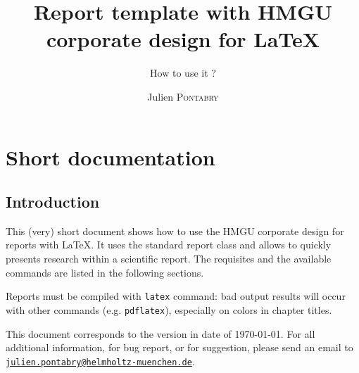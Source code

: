 \documentclass[a4paper,12pt,oneside]{report}
\title{Report template with HMGU corporate design for \LaTeX{}}
\subtitle{How to use it ?}
\author{Julien \textsc{Pontabry}}
\institute{Institute for Epigenetics and Stem Cells}
\begin{document}
	\maketitle

	\chapter{Short documentation}
	\section{Introduction}
		This (very) short document shows how to use the HMGU corporate design for reports with \LaTeX{}. It uses the standard report class and allows to quickly presents research within a scientific report. The requisites and the available commands are listed in the following sections.
		
		Reports must be compiled with \texttt{latex} command: bad output results will occur with other commands (e.g. \texttt{pdflatex}), especially on colors in chapter titles.
		
		This document corresponds to the version in date of \today. For all additional information, for bug report, or for suggestion, please send an email to \texttt{\url{julien.pontabry@helmholtz-muenchen.de}}.
	
\end{document}
